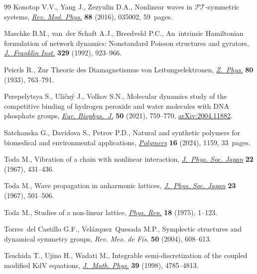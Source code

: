 \documentclass[10pt,a4paper]{amsart}
\numberwithin{equation}{section}
\begin{document}
\begin{thebibliography}{99}
Konotop V.V., Yang J., Zezyulin D.A., Nonlinear waves in
 $\mathcal{PT}$-symmetric systems,
 \href{https://doi.org/10.1103/RevModPhys.88.035002}{\textit{Rev. Mod. Phys.}}
 \textbf{88} (2016), 035002, 59~pages.

Maschke B.M., van~der Schaft A.J., Breedveld P.C., An~intrinsic {H}amiltonian
 formulation of network dynamics: {N}onstandard {P}oisson structures and
 gyrators,
 \href{https://doi.org/10.1016/S0016-0032(92)90049-M}{\textit{J.~Franklin
 Inst.}} \textbf{329} (1992), 923--966.

Peierls R., Zur {T}heorie des {D}iamagnetismus von {L}eitungselektronen,
 \href{https://doi.org/10.1007/BF01342591}{\textit{Z.~Phys.}} \textbf{80}
 (1933), 763--791.

Perepelytsya S., Uli\v{c}n\'y J., Volkov S.N., Molecular dynamics study of the
 competitive binding of hydrogen peroxide and water molecules with {DNA}
 phosphate groups,
 \href{https://doi.org/10.1007/s00249-021-01522-8}{\textit{Eur. Biophys.~J.}}
 \textbf{50} (2021), 759--770,
 \href{http://arxiv.org/abs/2004.11882}{arXiv:2004.11882}.

Satchanska G., Davidova S., Petrov P.D., Natural and synthetic polymers for
 biomedical and environmental applications,
 \href{https://doi.org/10.3390/polym16081159}{\textit{Polymers}} \textbf{16}
 (2024), 1159, 33~pages.

Toda M., Vibration of a chain with nonlinear interaction,
 \href{https://doi.org/10.1143/JPSJ.22.431}{\textit{J.~Phys. Soc. Japan}}
 \textbf{22} (1967), 431--436.

Toda M., Wave propagation in anharmonic lattices,
 \href{https://doi.org/10.1143/JPSJ.23.501}{\textit{J.~Phys. Soc. Japan}}
 \textbf{23} (1967), 501--506.

Toda M., Studies of a non-linear lattice,
 \href{https://doi.org/10.1016/0370-1573(75)90018-6}{\textit{Phys. Rep.}}
 \textbf{18} (1975), 1--123.


Torres~del Castillo G.F., Vel\'azquez~Quesada M.P., Symplectic structures and
 dynamical symmetry groups, \textit{Rev. Mex. de F\'is.} \textbf{50} (2004),
 608--613.

Tsuchida T., Ujino H., Wadati M., Integrable semi-discretization of the coupled
 modified {K}d{V} equations,
 \href{https://doi.org/10.1063/1.532537}{\textit{J.~Math. Phys.}} \textbf{39}
 (1998), 4785--4813.


\end{thebibliography}
\end{document}
